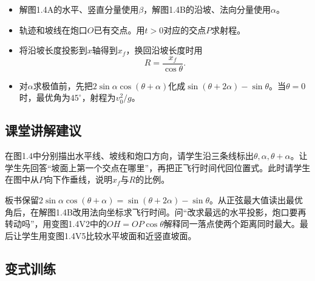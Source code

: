 \documentclass[UTF8,fontset=fandol,a4paper,11pt]{ctexart}
\begin{document}
\begin{itemize}
\item 解图1.4A的水平、竖直分量使用$\beta$，解图1.4B的沿坡、法向分量使用$\alpha$。
\item 轨迹和坡线在炮口$O$已有交点。用$t>0$对应的交点$P$求射程。
\item 将沿坡长度投影到$x$轴得到$x_f$，换回沿坡长度时用
\[
R=\frac{x_f}{\cos\theta}.
\]
\item 对$\alpha$求极值前，先把$2\sin\alpha\cos(\theta+\alpha)$化成$\sin(\theta+2\alpha)-\sin\theta$。当$\theta=0$时，最优角为$45^\circ$，射程为$v_0^2/g$。
\end{itemize}



\subsection*{课堂讲解建议}

在图1.4中分别描出水平线、坡线和炮口方向，请学生沿三条线标出$\theta,\alpha,\theta+\alpha$。让学生先回答“坡面上第一个交点在哪里”，再把正飞行时间代回位置式。此时请学生在图中从$P$向下作垂线，说明$x_f$与$R$的比例。

板书保留$2\sin\alpha\cos(\theta+\alpha)=\sin(\theta+2\alpha)-\sin\theta$。从正弦最大值读出最优角后，在解图1.4B改用法向坐标求飞行时间。问“改求最远的水平投影，炮口要再转动吗”，用变图1.4V2中的$OH=OP\cos\theta$解释同一落点使两个距离同时最大。最后让学生用变图1.4V5比较水平坡面和近竖直坡面。



\subsection*{变式训练}
\end{document}

